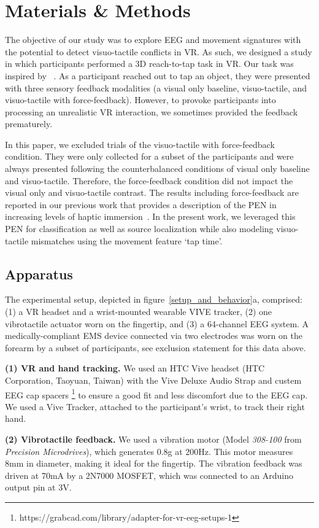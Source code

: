 \section{Materials \& Methods}
The objective of our study was to explore EEG and movement signatures with the potential to detect visuo-tactile conflicts in VR. As such, we designed a study in which participants performed a 3D reach-to-tap task in VR. Our task was inspired by ~\cite{Singh2018-qi}. As a participant reached out to tap an object, they were presented with three sensory feedback modalities (a visual only baseline, visuo-tactile, and visuo-tactile with force-feedback). However, to provoke participants into processing an unrealistic VR interaction, we sometimes provided the feedback prematurely.

In this paper, we excluded trials of the visuo-tactile with force-feedback condition. They were only collected for a subset of the participants and were always presented following the counterbalanced conditions of visual only baseline and visuo-tactile. Therefore, the force-feedback condition did not impact the visual only and visuo-tactile contrast. The results including force-feedback are reported in our previous work that provides a description of the PEN in increasing levels of haptic immersion~\cite{Gehrke2019-og}. In the present work, we leveraged this PEN for classification as well as source localization while also modeling visuo-tactile mismatches using the movement feature `tap time'.

\subsection{Apparatus}
The experimental setup, depicted in figure~\ref{setup_and_behavior}a, comprised: (1) a VR headset and a wrist-mounted wearable VIVE tracker, (2) one vibrotactile actuator worn on the fingertip, and (3) a 64-channel EEG system. A medically-compliant EMS device connected via two electrodes was worn on the forearm by a subset of participants, see exclusion statement for this data above.

\textbf{(1) VR and hand tracking.} We used an HTC Vive headset (HTC Corporation, Taoyuan, Taiwan) with the Vive Deluxe Audio Strap and custem EEG cap spacers \footnote{https://grabcad.com/library/adapter-for-vr-eeg-setups-1} to ensure a good fit and less discomfort due to the EEG cap. We used a Vive Tracker, attached to the participant's wrist, to track their right hand. 

\textbf{(2) Vibrotactile feedback.} We used a vibration motor (Model \textit{308-100} from \textit{Precision Microdrives}), which generates 0.8g at 200Hz. This motor measures 8mm in diameter, making it ideal for the fingertip. The vibration feedback was driven at 70mA by a 2N7000 MOSFET, which was connected to an Arduino output pin at 3V.


